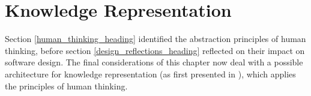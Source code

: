 %
%
%
%
%
%
%

\section{Knowledge Representation}
\label{knowledge_representation_heading}

Section \ref{human_thinking_heading} identified the abstraction principles of
human thinking, before section \ref{design_reflections_heading} reflected on
their impact on software design. The final considerations of this chapter now
deal with a possible architecture for knowledge representation (as first
presented in \cite{heller2006}), which applies the principles of human thinking.







